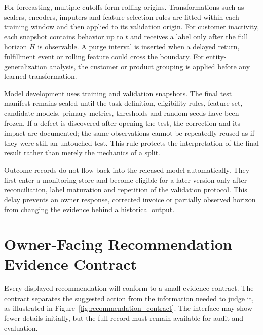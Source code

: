 For forecasting, multiple cutoffs form rolling origins. Transformations such as
scalers, encoders, imputers and feature-selection rules are fitted within each
training window and then applied to its validation origin. For customer
inactivity, each snapshot contains behavior up to $t$ and receives a label only
after the full horizon $H$ is observable. A purge interval is inserted when a
delayed return, fulfillment event or rolling feature could cross the boundary.
For entity-generalization analysis, the customer or product grouping is applied
before any learned transformation.

Model development uses training and validation snapshots. The final test
manifest remains sealed until the task definition, eligibility rules, feature
set, candidate models, primary metrics, thresholds and random seeds have been
frozen. If a defect is discovered after opening the test, the correction and
its impact are documented; the same observations cannot be repeatedly reused
as if they were still an untouched test. This rule protects the interpretation
of the final result rather than merely the mechanics of a split.

Outcome records do not flow back into the released model automatically. They
first enter a monitoring store and become eligible for a later version only
after reconciliation, label maturation and repetition of the validation
protocol. This delay prevents an owner response, corrected invoice or partially
observed horizon from changing the evidence behind a historical output.

\section{Owner-Facing Recommendation Evidence Contract}

Every displayed recommendation will conform to a small evidence contract. The
contract separates the suggested action from the information needed to judge
it, as illustrated in Figure~\ref{fig:recommendation_contract}. The interface
may show fewer details initially, but the full record must remain available for
audit and evaluation.

